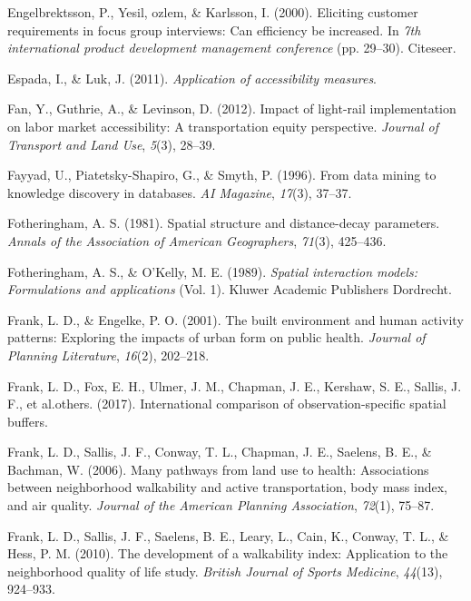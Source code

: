 \documentclass[
11pt, %
oneside, %
english, %
singlespacing, %
]{macthesis} %
\newlength{\cslhangindent}
\newenvironment{CSLReferences}[2] %
{\begin{list}{}{%
	\setlength{\itemindent}{0pt}
	\setlength{\leftmargin}{0pt}
	\setlength{\parsep}{0pt}
	\ifodd #1
	\setlength{\leftmargin}{\cslhangindent}
	\setlength{\itemindent}{-1\cslhangindent}
	\fi
	\setlength{\itemsep}{#2\baselineskip}}}
{\end{list}}
\begin{document}
\begin{CSLReferences}{1}{0}
Engelbrektsson, P., Yesil, ozlem, \& Karlsson, I. (2000). Eliciting customer requirements in focus group interviews: Can efficiency be increased. In \emph{7th international product development management conference} (pp. 29--30). Citeseer.

Espada, I., \& Luk, J. (2011). \emph{Application of accessibility measures}.

Fan, Y., Guthrie, A., \& Levinson, D. (2012). Impact of light-rail implementation on labor market accessibility: A transportation equity perspective. \emph{Journal of Transport and Land Use}, \emph{5}(3), 28--39.

Fayyad, U., Piatetsky-Shapiro, G., \& Smyth, P. (1996). From data mining to knowledge discovery in databases. \emph{AI Magazine}, \emph{17}(3), 37--37.

Fotheringham, A. S. (1981). Spatial structure and distance-decay parameters. \emph{Annals of the Association of American Geographers}, \emph{71}(3), 425--436.

Fotheringham, A. S., \& O'Kelly, M. E. (1989). \emph{Spatial interaction models: Formulations and applications} (Vol. 1). Kluwer Academic Publishers Dordrecht.

Frank, L. D., \& Engelke, P. O. (2001). The built environment and human activity patterns: Exploring the impacts of urban form on public health. \emph{Journal of Planning Literature}, \emph{16}(2), 202--218.

Frank, L. D., Fox, E. H., Ulmer, J. M., Chapman, J. E., Kershaw, S. E., Sallis, J. F., et al.others. (2017). International comparison of observation-specific spatial buffers.

Frank, L. D., Sallis, J. F., Conway, T. L., Chapman, J. E., Saelens, B. E., \& Bachman, W. (2006). Many pathways from land use to health: Associations between neighborhood walkability and active transportation, body mass index, and air quality. \emph{Journal of the American Planning Association}, \emph{72}(1), 75--87.

Frank, L. D., Sallis, J. F., Saelens, B. E., Leary, L., Cain, K., Conway, T. L., \& Hess, P. M. (2010). The development of a walkability index: Application to the neighborhood quality of life study. \emph{British Journal of Sports Medicine}, \emph{44}(13), 924--933.


\end{CSLReferences}
\end{document}
